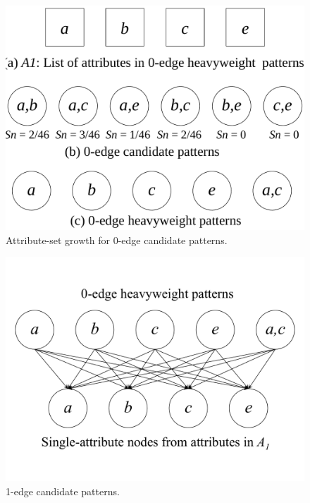 \begin{figure}[h!]
\centering
    \includegraphics[scale=0.2]{figures/example_0-edge_2-attribute.pdf}
    \caption{Attribute-set growth for 0-edge candidate patterns.}
    \label{fig:example_0-edge_2-attribute}  
\end{figure}

\begin{figure}[h!]
\centering
    \includegraphics[scale=0.2]{figures/example_1-edge.pdf}
    \caption{1-edge candidate patterns.}
    \label{fig:example_1-edge}  
\end{figure}

